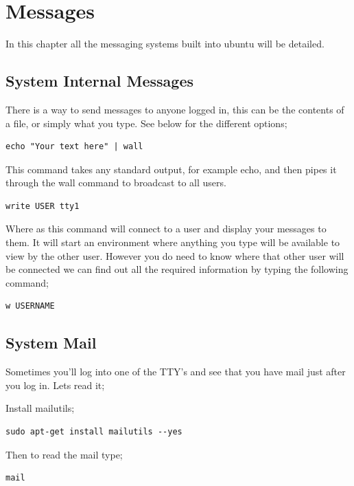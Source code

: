 \chapter{Messages}
\label{chp:messages}

In this chapter all the messaging systems built into ubuntu will be detailed.

\section{System Internal Messages}

There is a way to send messages to anyone logged in, this can be the contents of a file, or simply what you type.  See below for the different options;

\begin{lstlisting}
echo "Your text here" | wall
\end{lstlisting}

This command takes any standard output, for example echo, and then pipes it through the wall command to broadcast to all users.

\begin{lstlisting}
write USER tty1
\end{lstlisting}

Where as this command will connect to a user and display your messages to them.  It will start an environment where anything you type will be available to view by the other user.  However you do need to know where that other user will be connected we can find out all the required information by typing the following command;

\begin{lstlisting}
w USERNAME
\end{lstlisting}

\section{System Mail}

Sometimes you'll log into one of the TTY's and see that you have mail just after you log in.  Lets read it;

Install mailutils;

\begin{lstlisting}
sudo apt-get install mailutils --yes
\end{lstlisting}

Then to read the mail type;

\begin{lstlisting}
mail
\end{lstlisting}

